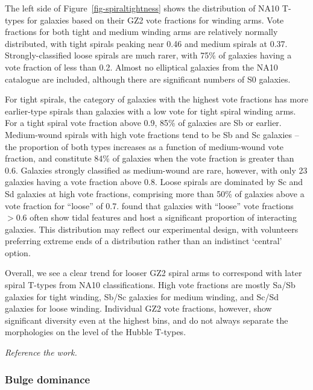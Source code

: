 \documentclass[useAMS,usenatbib]{mn2e}
\begin{document}
The left side of Figure~\ref{fig-spiraltightness} shows the distribution of NA10 T-types for galaxies based on their GZ2 vote fractions for winding arms. Vote fractions for both tight and medium winding arms are relatively normally distributed, with tight spirals peaking near 0.46 and medium spirals at 0.37. Strongly-classified loose spirals are much rarer, with 75\% of galaxies having a vote fraction of less than 0.2. Almost no elliptical galaxies from the NA10 catalogue are included, although there are significant numbers of S0 galaxies. 

For tight spirals, the category of galaxies with the highest vote fractions has more earlier-type spirals than galaxies with a low vote for tight spiral winding arms. For a tight spiral vote fraction above 0.9, 85\% of galaxies are Sb or earlier. Medium-wound spirals with high vote fractions tend to be Sb and Sc galaxies -- the proportion of both types increases as a function of medium-wound vote fraction, and constitute 84\% of galaxies when the vote fraction is greater than 0.6. Galaxies strongly classified as medium-wound are rare, however, with only 23 galaxies having a vote fraction above 0.8.  Loose spirals are dominated by Sc and Sd galaxies at high vote fractions, comprising more than 50\% of galaxies above a vote fraction for ``loose'' of 0.7. \citet{cas13} found that galaxies with ``loose'' vote fractions $>0.6$ often show tidal features and host a significant proportion of interacting galaxies. This distribution may reflect our experimental design, with volunteers preferring extreme ends of a distribution rather than an indistinct `central' option. 

Overall, we see a clear trend for looser GZ2 spiral arms to correspond with later spiral T-types from NA10 classifications. High vote fractions are mostly Sa/Sb galaxies for tight winding, Sb/Sc galaxies for medium winding, and Sc/Sd galaxies for loose winding. Individual GZ2 vote fractions, however, show significant diversity even at the highest bins, and do not always separate the morphologies on the level of the Hubble T-types. 

{\em Reference the \citet{dav13} work.}

\subsubsection{Bulge dominance}
\end{document}
